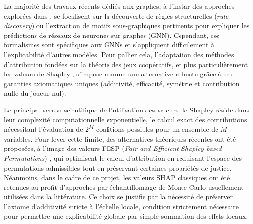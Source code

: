 La majorité des travaux récents dédiés aux graphes, à l'instar des approches explorées dans \cite{kamal2025game}, se focalisent sur la découverte de règles structurelles (\textit{rule discovery}) ou l'extraction de motifs sous-graphiques pertinents pour expliquer les prédictions de réseaux de neurones sur graphes (GNN). Cependant, ces formalismes sont spécifiques aux GNNs et s'appliquent difficilement à l'explicabilité d'autres modèles. Pour pallier cela, l'adaptation des méthodes d'attribution fondées sur la théorie des jeux coopératifs, et plus particulièrement les valeurs de Shapley \cite{lordShapleyOriginal_1953}, s'impose comme une alternative robuste grâce à ses garanties axiomatiques uniques (additivité, efficacité, symétrie et contribution nulle du joueur nul).

Le principal verrou scientifique de l'utilisation des valeurs de Shapley réside dans leur complexité computationnelle exponentielle, le calcul exact des contributions nécessitant l'évaluation de $2^M$ coalitions possibles pour un ensemble de $M$ variables. Pour lever cette limite, des alternatives théoriques récentes ont été proposées, à l'image des valeurs FESP (\textit{Fair and Efficient Shapley-based Permutations}) \cite{fesp2022}, qui optimisent le calcul d'attribution en réduisant l'espace des permutations admissibles tout en préservant certaines propriétés de justice. Néanmoins, dans le cadre de ce projet, les valeurs SHAP classiques ont été retenues au profit d'approches par échantillonnage de Monte-Carlo usuellement utilisées dans la littérature. Ce choix se justifie par la nécessité de préserver l'axiome d'additivité stricte à l'échelle locale, condition strictement nécessaire pour permettre une explicabilité globale par simple sommation des effets locaux.
